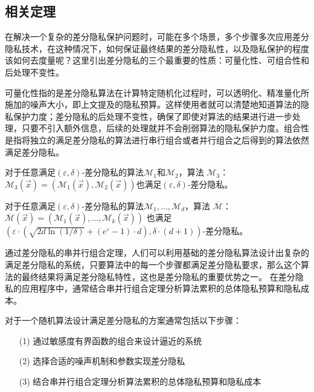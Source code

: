 \subsection{相关定理}

在解决一个复杂的差分隐私保护问题时，可能在多个场景，多个步骤多次应用差分隐私技术，在这种情况下，如何保证最终结果的差分隐私性，以及隐私保护的程度该如何去度量呢？这里引出差分隐私的三个最重要的性质：可量化性、可组合性和后处理不变性。

可量化性指的是差分隐私算法在计算特定随机化过程时，可以透明化、精准量化所施加的噪声大小，即上文提及的隐私预算。这样使用者就可以清楚地知道算法的隐私保护力度；差分隐私的后处理不变性，确保了即使对算法的结果进行进一步处理，只要不引入额外信息，后续的处理就并不会削弱算法的隐私保护力度。组合性是指将独立的满足差分隐私的算法进行串行组合或者并行组合之后得到的算法依然满足差分隐私。

\begin{theorem}\label{串行组合}
对于任意满足$(\varepsilon, \delta)$-差分隐私的算法$\mathcal{M}_{1}$和$\mathcal{M}_{2}$，算法 $\mathcal{M}_{3}$：$\mathcal{M}_{3}(\vec{x})=\left(\mathcal{M}_{1}(\vec{x}), \mathcal{M}_{2}(\vec{x})\right)$也满足$(\varepsilon, \delta)$-差分隐私。
\end{theorem}

\begin{theorem}\label{并行组合}
对于任意满足$(\varepsilon, \delta)$-差分隐私的算法$\mathcal{M}_{1}, \ldots, \mathcal{M}_{d}$，算法 $\overline{\mathcal{M}}$：$\overline{\mathcal{M}}(\vec{x})=\left(\mathcal{M}_{1}(\vec{x}), \ldots, \mathcal{M}_{k}(\vec{x})\right)$ 也满足$\left(\varepsilon \cdot\left(\sqrt{2 d \ln (1 / \delta)}+\left(e^{\varepsilon}-1\right) \cdot d\right), \delta \cdot(d+1)\right)$-差分隐私。
\end{theorem}

通过差分隐私的串并行组合定理，人们可以利用基础的差分隐私算法设计出复杂的满足差分隐私的系统，只要算法中的每一个步骤都满足差分隐私要求，那么这个算法的最终结果将满足差分隐私特性，这也是差分隐私的重要优势之一。 在差分隐私的应用程序中，通常结合串并行组合定理分析算法累积的总体隐私预算和隐私成本。

对于一个随机算法设计满足差分隐私的方案通常包括以下步骤：
\begin{enumerate}
\item [(1)] 通过敏感度有界函数的组合来设计逼近的系统
\item [(2)] 选择合适的噪声机制和参数实现差分隐私
\item [(3)] 结合串并行组合定理分析算法累积的总体隐私预算和隐私成本
\end{enumerate}


